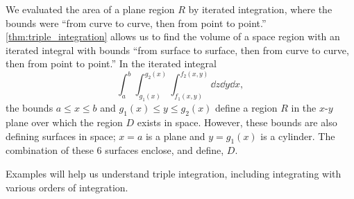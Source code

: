 We evaluated the area of a plane region $R$ by iterated integration, where the bounds were ``from curve to curve, then from point to point.'' \autoref{thm:triple_integration} allows us to find the volume of a space region with an iterated integral with bounds ``from surface to surface, then from curve to curve, then from point to point.'' In the iterated integral 
\[\int_a^b\int_{g_1(x)}^{g_2(x)}\int_{f_1(x,y)}^{f_2(x,y)} \dd z\dd y\dd x,\]
the bounds $a\leq x\leq b$ and $g_1(x)\leq y\leq g_2(x)$ define a region $R$ in the $x$-$y$ plane over which the region $D$ exists in space. However, these bounds are also defining surfaces in space; $x=a$ is a plane and $y=g_1(x)$ is a cylinder. The combination of these 6 surfaces enclose, and define, $D$.


Examples will help us understand triple integration, including integrating with various orders of integration.



